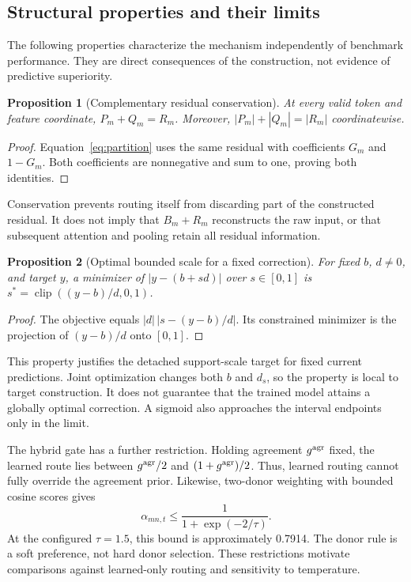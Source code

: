 \documentclass[review,12pt]{elsarticle}
\newcommand{\clip}{\operatorname{clip}}
\newtheorem{proposition}{Proposition}
\begin{document}
\subsection{Structural properties and their limits}
The following properties characterize the mechanism independently of benchmark performance. They are direct consequences of the construction, not evidence of predictive superiority.

\begin{proposition}[Complementary residual conservation]
At every valid token and feature coordinate, $P_m+Q_m=R_m$. Moreover, $|P_m|+|Q_m|=|R_m|$ coordinatewise.
\end{proposition}
\begin{proof}
Equation~\eqref{eq:partition} uses the same residual with coefficients $G_m$ and $1-G_m$. Both coefficients are nonnegative and sum to one, proving both identities.
\end{proof}
Conservation prevents routing itself from discarding part of the constructed residual. It does not imply that $B_m+R_m$ reconstructs the raw input, or that subsequent attention and pooling retain all residual information.

\begin{proposition}[Optimal bounded scale for a fixed correction]
For fixed $b$, $d\ne0$, and target $y$, a minimizer of $|y-(b+sd)|$ over $s\in[0,1]$ is $s^*=\clip((y-b)/d,0,1)$.
\end{proposition}
\begin{proof}
The objective equals $|d|\,|s-(y-b)/d|$. Its constrained minimizer is the projection of $(y-b)/d$ onto $[0,1]$.
\end{proof}
This property justifies the detached support-scale target for fixed current predictions. Joint optimization changes both $b$ and $d_s$, so the property is local to target construction. It does not guarantee that the trained model attains a globally optimal correction. A sigmoid also approaches the interval endpoints only in the limit.

The hybrid gate has a further restriction. Holding agreement $g^{\rm agr}$ fixed, the learned route lies between $g^{\rm agr}/2$ and $(1+g^{\rm agr})/2$. Thus, learned routing cannot fully override the agreement prior. Likewise, two-donor weighting with bounded cosine scores gives
\begin{equation}
\alpha_{mn,t}\le\frac{1}{1+\exp(-2/\tau)}.
\end{equation}
At the configured $\tau=1.5$, this bound is approximately 0.7914. The donor rule is a soft preference, not hard donor selection. These restrictions motivate comparisons against learned-only routing and sensitivity to temperature.
\end{document}
